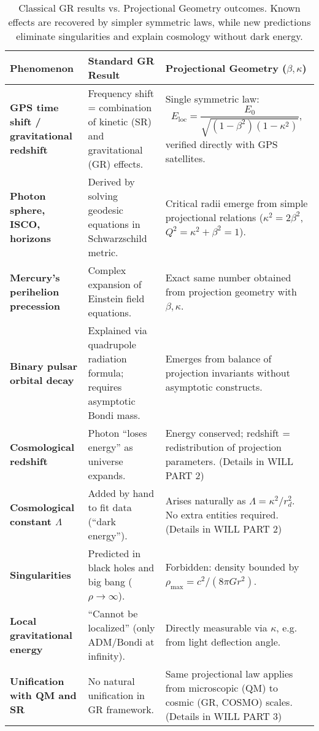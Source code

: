 \documentclass[12pt, a4paper]{article}
\begin{document}
\begin{table}[h!]
\centering
\renewcommand{\arraystretch}{1.3}
\begin{tabular}{|p{4cm}|p{6cm}|p{6cm}|}
\hline
\textbf{Phenomenon} & \textbf{Standard GR Result} & \textbf{Projectional Geometry (\(\beta,\kappa\))} \\
\hline
\textbf{GPS time shift / gravitational redshift} &
Frequency shift = combination of kinetic (SR) and gravitational (GR) effects. &
Single symmetric law:
\[
E_{\text{loc}}=\frac{E_0}{\sqrt{(1-\beta^2)(1-\kappa^2)}},
\]
verified directly with GPS satellites. \\
\hline
\textbf{Photon sphere, ISCO, horizons} &
Derived by solving geodesic equations in Schwarzschild metric. &
Critical radii emerge from simple projectional relations
(\(\kappa^2=2\beta^2\), \(Q^2=\kappa^2+\beta^2=1\)). \\
\hline
\textbf{Mercury’s perihelion precession} &
Complex expansion of Einstein field equations. &
Exact same number obtained from projection geometry with \(\beta,\kappa\). \\
\hline
\textbf{Binary pulsar orbital decay} &
Explained via quadrupole radiation formula; requires asymptotic Bondi mass. &
Emerges from balance of projection invariants without asymptotic constructs. \\
\hline
\textbf{Cosmological redshift} &
Photon “loses energy” as universe expands. &
Energy conserved; redshift = redistribution of projection parameters.  (Details in WILL PART 2)\\
\hline
\textbf{Cosmological constant \(\Lambda\)} &
Added by hand to fit data (“dark energy”). &
Arises naturally as \(\Lambda = \kappa^2/r_d^2\). No extra entities required. (Details in WILL PART 2)\\
\hline
\textbf{Singularities} &
Predicted in black holes and big bang (\(\rho \to \infty\)). &
Forbidden: density bounded by \(\rho_{\max} = c^2/(8\pi G r^2)\). \\
\hline
\textbf{Local gravitational energy} &
“Cannot be localized” (only ADM/Bondi at infinity). &
Directly measurable via \(\kappa\), e.g. from light deflection angle. \\
\hline
\textbf{Unification with QM and SR} &
No natural unification in GR framework. &
Same projectional law applies from microscopic (QM) to cosmic (GR, COSMO) scales.  (Details in WILL PART 3)\\
\hline
\end{tabular}
\caption{Classical GR results vs. Projectional Geometry outcomes. Known effects are recovered by simpler symmetric laws, while new predictions eliminate singularities and explain cosmology without dark energy.}
\end{table}
\end{document}
